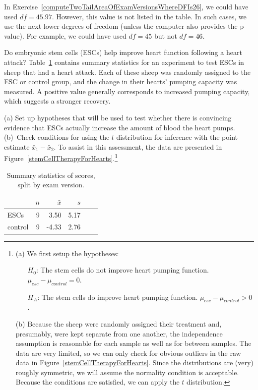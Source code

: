 In Exercise~\ref{computeTwoTailAreaOfExamVersionsWhereDFIs26}, we could have used $df=45.97$. However, this value is not listed in the table. In such cases, we use the next lower degrees of freedom (unless the computer also provides the p-value). For example, we could have used $df=45$ but not $df=46$. 


\begin{exercise} \label{exerciseToEvaluteWhetherESCsAreHelpfulInImprovingHeartFunctionInSheep}
Do embryonic stem cells (ESCs) help improve heart function following a heart attack? Table~\ref{summaryStatsForSheepHeartDataWhoReceivedMiceESCs} contains summary statistics for an experiment to test ESCs in sheep that had a heart attack. Each of these sheep was randomly assigned to the ESC or control group, and the change in their hearts' pumping capacity was measured. A positive value generally corresponds to increased pumping capacity, which suggests a stronger recovery. 

(a) Set up hypotheses that will be used to test whether there is convincing evidence that ESCs actually increase the amount of blood the heart pumps. (b)~Check conditions for using the $t$ distribution for inference with the point estimate $\bar{x}_1 - \bar{x}_2$. To assist in this assessment, the data are presented in Figure~\ref{stemCellTherapyForHearts}.\footnote{(a) We first setup the hypotheses:
\begin{itemize}
\setlength{\itemsep}{0mm}
\item[$H_0$:] The stem cells do not improve heart pumping function. $\mu_{esc} - \mu_{control} = 0$.
\item[$H_A$:] The stem cells do improve heart pumping function. $\mu_{esc} - \mu_{control} > 0$.
\end{itemize}
(b) Because the sheep were randomly assigned their treatment and, presumably, were kept separate from one another, the independence assumption is reasonable for each sample as well as for between samples. The data are very limited, so we can only check for obvious outliers in the raw data in Figure~\ref{stemCellTherapyForHearts}. Since the distributions are (very) roughly symmetric, we will assume the normality condition is acceptable. Because the conditions are satisfied, we can apply the $t$ distribution.}
\end{exercise}

\begin{table}[h]
\centering
\begin{tabular}{l rrrrr}
\hline
\hspace{10mm}	& $n$	& $\bar{x}$	& $s$  	 \\
\hline
ESCs		& 9		& 3.50		& 5.17  	\\
control		& 9		& -4.33		& 2.76  	 \\
\hline
\end{tabular}
\caption{Summary statistics of scores, split by exam version.}
\label{summaryStatsForSheepHeartDataWhoReceivedMiceESCs}
\end{table}

